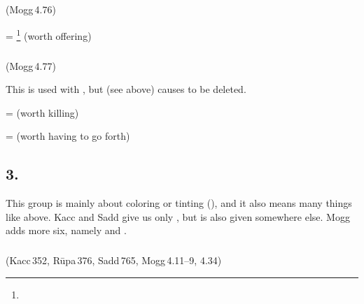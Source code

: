 \subparagraph*{} (Mogg\,4.76)\label{pacct2:M-dneyya}

 = \footnote{} (worth offering) \par

\subparagraph*{} (Mogg\,4.77)\label{pacct2:raaya}

This is used with , but  (see above) causes  to be deleted.

 =  (worth killing) \par
{} =  (worth having to go forth) \par

\subsection*{3.\ }\label{tadgroup3}

This group is mainly about coloring or tinting (), and it also means many things like above. Kacc and Sadd give us only , but  is also given somewhere else. Mogg adds more six, namely  and .

\subparagraph*{} (Kacc\,352, R\=upa\,376, Sadd\,765, Mogg\,4.11--9, 4.34)\label{pacct3:dna}

